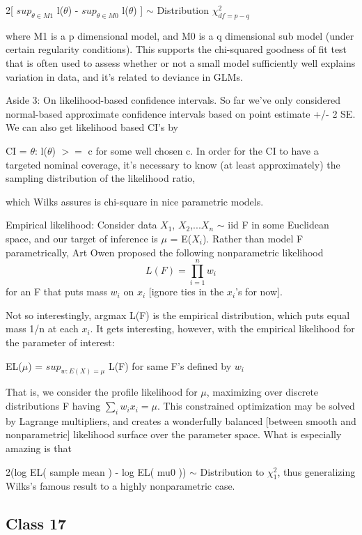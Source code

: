 \documentclass[11pt,a4paper]{article}
\begin{document}
	2[  $sup_{\theta \in M1}$  l($\theta$)   - $sup_{\theta \in M0}$ l($\theta$) ]  $\sim$ Distribution   $\chi^2_{df = p - q}$
	
	where M1 is a p dimensional model, and M0 is a q dimensional sub model (under certain regularity conditions).  This supports the chi-squared goodness of fit test that is often used to assess whether or not a small model sufficiently well explains variation in data, and it's related to deviance in GLMs.
	
	Aside 3:  On likelihood-based confidence intervals.   So far we've only considered normal-based approximate confidence intervals based on point estimate +/- 2 SE.  We can also get likelihood based CI's by
	
	CI = { $\theta$: l($\theta$) $>=$ c }   for some well chosen c.   In order for the CI to have a targeted nominal coverage, it's necessary to know (at least approximately) the sampling distribution of the likelihood ratio,
	
	which Wilks assures is chi-square in nice parametric models.
	
	Empirical likelihood:  Consider data $X_1$, $X_2$,$...X_n$ $\sim$ iid F in some Euclidean space, and our target of inference is $\mu$ = E($X_i$).   Rather than model F parametrically, Art Owen proposed the following nonparametric likelihood 
	\begin{equation}
	L(F) = \prod_{i=1}^n w_i 
	\end{equation}
    for an F that puts mass $w_i$ on $x_i$   [ignore ties in the $x_i$'s for now].
	
	Not so interestingly, argmax L(F) is the empirical distribution, which puts equal mass 1/n at each $x_i$.   It gets interesting, however, with the empirical likelihood for the parameter of interest:
	
	EL($\mu$) = $sup_{w: E(X)=\mu}$  L(F)      for same F's defined by {$w_i$}   
	
	That is, we consider the profile likelihood for $\mu$, maximizing over discrete distributions F having $\sum_i w_i x_i = \mu$.  This constrained optimization may be solved by Lagrange multipliers, and creates a wonderfully balanced [between smooth and nonparametric] likelihood surface over the parameter space.  What is especially amazing is that 
	
	2(log EL( sample mean ) - log EL( mu0 ))  $\sim$ Distribution to $\chi^2_1$,  thus generalizing Wilks's famous result to a highly nonparametric case.
	
	\subsection*{Class 17}
	
\end{document}
